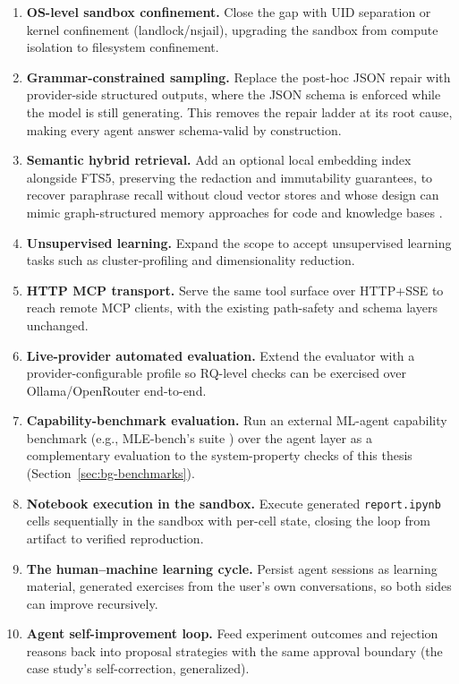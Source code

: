 \begin{enumerate}
	\item \textbf{OS-level sandbox confinement.} Close the gap with UID separation or kernel confinement (landlock/nsjail), upgrading the sandbox from compute isolation to filesystem confinement.
	\item \textbf{Grammar-constrained sampling.} Replace the post-hoc JSON repair with provider-side structured outputs, where the JSON schema is enforced while the model is still generating. This removes the repair ladder at its root cause, making every agent answer schema-valid by construction.
	\item \textbf{Semantic hybrid retrieval.} Add an optional local embedding index alongside FTS5, preserving the redaction and immutability guarantees, to recover paraphrase recall without cloud vector stores and whose design can mimic graph-structured memory approaches for code and knowledge bases \cite{mempalace2026,codebasememory2026}.

	\item \textbf{Unsupervised learning.} Expand the scope to accept unsupervised learning tasks such as cluster-profiling and dimensionality reduction.

	\item \textbf{HTTP MCP transport.} Serve the same tool surface over HTTP+SSE to reach remote MCP clients, with the existing path-safety and schema layers unchanged.

	\item \textbf{Live-provider automated evaluation.} Extend the evaluator with a provider-configurable profile so RQ-level checks can be exercised over Ollama/OpenRouter end-to-end.

	\item \textbf{Capability-benchmark evaluation.} Run an external ML-agent capability benchmark (e.g., MLE-bench's suite \cite{chan2024mlebench}) over the agent layer as a complementary evaluation to the system-property checks of this thesis (Section~\ref{sec:bg-benchmarks}).

	\item \textbf{Notebook execution in the sandbox.} Execute generated \texttt{report.ipynb} cells sequentially in the sandbox with per-cell state, closing the loop from artifact to verified reproduction.

	\item \textbf{The human--machine learning cycle.} Persist agent sessions as learning material, generated exercises from the user's own conversations, so both sides can improve recursively.

	\item \textbf{Agent self-improvement loop.} Feed experiment outcomes and rejection reasons back into proposal strategies with the same approval boundary (the case study's self-correction, generalized).

\end{enumerate}

